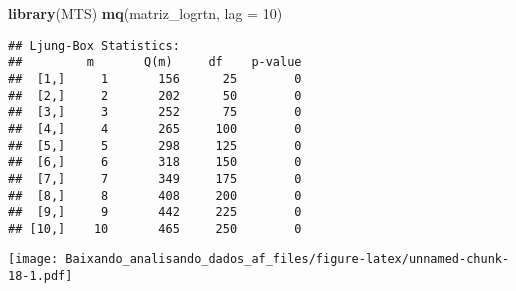 \documentclass[]{article}
\newenvironment{Shaded}{\begin{snugshade}}{\end{snugshade}}
\newcommand{\KeywordTok}[1]{\textcolor[rgb]{0.13,0.29,0.53}{\textbf{{#1}}}}
\newcommand{\DataTypeTok}[1]{\textcolor[rgb]{0.13,0.29,0.53}{{#1}}}
\newcommand{\DecValTok}[1]{\textcolor[rgb]{0.00,0.00,0.81}{{#1}}}
\newcommand{\NormalTok}[1]{{#1}}
\begin{document}
\begin{Shaded}
\begin{Highlighting}[]
\KeywordTok{library}\NormalTok{(MTS)}
\KeywordTok{mq}\NormalTok{(matriz_logrtn, }\DataTypeTok{lag =} \DecValTok{10}\NormalTok{)}
\end{Highlighting}
\end{Shaded}

\begin{verbatim}
## Ljung-Box Statistics:  
##         m       Q(m)     df    p-value
##  [1,]     1       156      25        0
##  [2,]     2       202      50        0
##  [3,]     3       252      75        0
##  [4,]     4       265     100        0
##  [5,]     5       298     125        0
##  [6,]     6       318     150        0
##  [7,]     7       349     175        0
##  [8,]     8       408     200        0
##  [9,]     9       442     225        0
## [10,]    10       465     250        0
\end{verbatim}

\texttt{[image: Baixando\_analisando\_dados\_af\_files/figure-latex/unnamed-chunk-18-1.pdf]}
\end{document}

